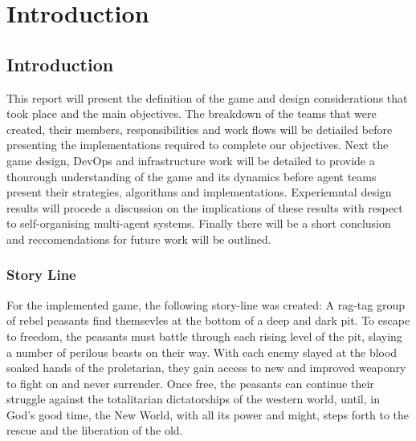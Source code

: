\chapter{Introduction}\label{introduction}

\section{Introduction}\label{sec:intro}


This report will present the definition of the game and design considerations that took place and the main objectives. The breakdown of the teams that were created, their members, responsibilities and work flows will be detiailed before presenting the implementations required to complete our objectives. Next the game design, DevOps and infrastructure work will be detailed to provide a thourough understanding of the game and its dynamics before agent teams present their strategies, algorithms and implementations. Experiemntal design results will procede a discussion on the implications of these results with respect to self-organising multi-agent systems. Finally there will be a short conclusion and reccomendations for future work will be outlined. 

\subsection{Story Line}\label{sec:story line}

For the implemented game, the following story-line was created: A rag-tag group of rebel peasants find themsevles at the bottom of a deep and dark pit. To escape to freedom, the peasants must battle through each rising level of the pit, slaying a number of perilous beasts on their way. With each enemy slayed at the blood soaked hands of the proletarian, they gain access to new and improved weaponry to fight on and never surrender. Once free, the peasants can continue their struggle against the totalitarian dictatorships of the western world, until, in God's good time, the New World, with all its power and might, steps forth to the rescue and the liberation of the old.  

